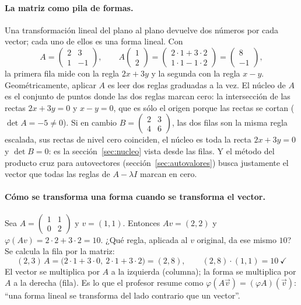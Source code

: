 \paragraph{La matriz como pila de formas.} Una transformación lineal del plano al plano
devuelve dos números por cada vector; cada uno de ellos es una forma lineal. Con
\[
  A=\begin{pmatrix}2&3\\1&-1\end{pmatrix},\qquad
  A\begin{pmatrix}1\\2\end{pmatrix}=\begin{pmatrix}2\cdot1+3\cdot2\\1\cdot1-1\cdot2\end{pmatrix}
  =\begin{pmatrix}8\\-1\end{pmatrix},
\]
la primera fila mide con la regla \(2x+3y\) y la segunda con la regla \(x-y\).
Geométricamente, aplicar \(A\) es leer dos reglas graduadas a la vez. El núcleo de \(A\)
es el conjunto de puntos donde las dos reglas marcan cero: la intersección de las rectas
\(2x+3y=0\) y \(x-y=0\), que es sólo el origen porque las rectas se cortan
(\(\det A=-5\neq0\)). Si en cambio \(B=\begin{pmatrix}2&3\\4&6\end{pmatrix}\), las dos
filas son la misma regla escalada, sus rectas de nivel cero coinciden, el núcleo es toda
la recta \(2x+3y=0\) y \(\det B=0\): es la sección~\ref{sec:nucleo} vista desde las
filas. Y el método del producto cruz para autovectores (sección~\ref{sec:autovalores})
busca justamente el vector que todas las reglas de \(A-\lambda I\) marcan en cero.

\paragraph{Cómo se transforma una forma cuando se transforma el vector.} Sea
\(A=\begin{pmatrix}1&1\\0&2\end{pmatrix}\) y \(v=(1,1)\). Entonces \(Av=(2,2)\) y
\(\varphi(Av)=2\cdot2+3\cdot2=10\). ¿Qué regla, aplicada al \(v\) original, da ese mismo
\(10\)? Se calcula la fila por la matriz:
\[
  (2,3)\,A=\bigl(2\cdot1+3\cdot0,\ 2\cdot1+3\cdot2\bigr)=(2,8),
  \qquad (2,8)\cdot(1,1)=10\ \checkmark
\]
El vector se multiplica por \(A\) a la izquierda (columna); la forma se multiplica por
\(A\) a la derecha (fila). Es lo que el profesor resume como \(\varphi(A\vec v)=(\varphi A)(\vec v)\):
``una forma lineal se transforma del lado contrario que un vector''.


